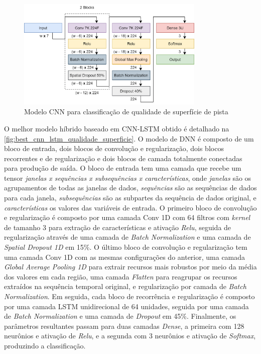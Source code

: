 \begin{figure}[h!]
  \centering
  \caption{Modelo CNN para classificação de qualidade de superfície de pista}
  \label{fig:best_cnn_qualidade_superficie}
  \includegraphics[width=0.8\textwidth]{figuras/fig_48.png}
\end{figure}

O melhor modelo híbrido baseado em CNN-LSTM obtido é detalhado na \autoref{fig:best_cnn_lstm_qualidade_superficie}. O modelo de DNN é composto de um bloco de entrada, dois blocos de convolução e regularização, dois blocos recorrentes e de regularização e dois blocos de camada totalmente conectadas para produção de saída. O bloco de entrada tem uma camada que recebe um tensor \emph{janelas x sequências x subsequências x características}, onde \emph{janelas} são os agrupamentos de todas as janelas de dados, \emph{sequências} são as sequências de dados para cada janela, \emph{subsequências} são as subpartes da sequência de dados original, e \emph{características} os valores das variáveis de entrada. O primeiro bloco de convolução e regularização é composto por uma camada Conv 1D com 64 filtros com \textit{kernel} de tamanho 3 para extração de características e ativação \textit{Relu}, seguida de regularização através de uma camada de \textit{Batch Normalization} e uma camada de \textit{Spatial Dropout 1D} em 15\%. O último bloco de convolução e regularização tem uma camada Conv 1D com as mesmas configurações do anterior, uma camada \textit{Global Average Pooling 1D} para extrair recursos mais robustos por meio da média dos valores em cada região, uma camada \textit{Flatten} para reagrupar os recursos extraídos na sequência temporal original, e regularização por camada de \textit{Batch Normalization}. Em seguida, cada bloco de recorrência e regularização é composto por uma camada LSTM unidirecional de 64 unidades, seguida por uma camada de \textit{Batch Normalization} e uma camada de \textit{Dropout} em 45\%. Finalmente, os parâmetros resultantes passam para duas camadas \textit{Dense}, a primeira com 128 neurônios e ativação de \textit{Relu}, e a segunda com 3 neurônios e ativação de \textit{Softmax}, produzindo a classificação. 

